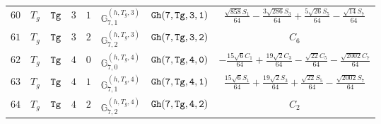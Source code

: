 \documentclass[fleqn,8pt]{jsarticle}
\begin{document}
\begin{table}[ht!]
\begin{center}
\begin{tabular}{cccccccc}
$ 60 $ & $ T_{g} $ & $ {\tt Tg} $ & $ 3 $ & $ 1 $ & $ \mathbb{G}_{7,1}^{(h,T_{g},3)} $ & $ {\tt Gh(7,Tg,3,1)} $ & $ \frac{\sqrt{858} S_{1}}{64} - \frac{3 \sqrt{286} S_{3}}{64} + \frac{5 \sqrt{26} S_{5}}{64} - \frac{\sqrt{14} S_{7}}{64} $ \\
$ 61 $ & $ T_{g} $ & $ {\tt Tg} $ & $ 3 $ & $ 2 $ & $ \mathbb{G}_{7,2}^{(h,T_{g},3)} $ & $ {\tt Gh(7,Tg,3,2)} $ & $ C_{6} $ \\
$ 62 $ & $ T_{g} $ & $ {\tt Tg} $ & $ 4 $ & $ 0 $ & $ \mathbb{G}_{7,0}^{(h,T_{g},4)} $ & $ {\tt Gh(7,Tg,4,0)} $ & $ - \frac{15 \sqrt{6} C_{1}}{64} + \frac{19 \sqrt{2} C_{3}}{64} - \frac{\sqrt{22} C_{5}}{64} - \frac{\sqrt{2002} C_{7}}{64} $ \\
$ 63 $ & $ T_{g} $ & $ {\tt Tg} $ & $ 4 $ & $ 1 $ & $ \mathbb{G}_{7,1}^{(h,T_{g},4)} $ & $ {\tt Gh(7,Tg,4,1)} $ & $ \frac{15 \sqrt{6} S_{1}}{64} + \frac{19 \sqrt{2} S_{3}}{64} + \frac{\sqrt{22} S_{5}}{64} - \frac{\sqrt{2002} S_{7}}{64} $ \\
$ 64 $ & $ T_{g} $ & $ {\tt Tg} $ & $ 4 $ & $ 2 $ & $ \mathbb{G}_{7,2}^{(h,T_{g},4)} $ & $ {\tt Gh(7,Tg,4,2)} $ & $ C_{2} $ \\
 \hline \hline
\end{tabular}
\end{center}
\end{table}
\end{document}
